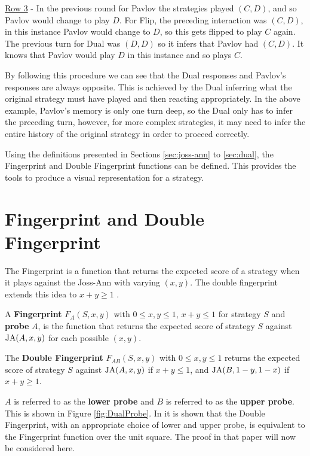 \underline{Row 3} - In the previous round for Pavlov the strategies played $(C, D)$, and so Pavlov would change to play $D$.
For Flip, the preceding interaction was $(C, D)$, in this instance Pavlov would change to $D$, so this gets flipped to play $C$ again.
The previous turn for Dual was $(D, D)$ so it infers that Pavlov had $(C, D)$.
It knows that Pavlov would play $D$ in this instance and so plays $C$.

By following this procedure we can see that the Dual responses and Pavlov's responses are always opposite.
This is achieved by the Dual inferring what the original strategy must have played and then reacting appropriately.
In the above example, Pavlov's memory is only one turn deep, so the Dual only has to infer the preceding turn, however, for more complex strategies, it may need to infer the entire history of the original strategy in order to proceed correctly.

Using the definitions presented in Sections \ref{sec:joss-ann} to \ref{sec:dual}, the Fingerprint and Double Fingerprint functions can be defined.
This provides the tools to produce a visual representation for a strategy.



\section{Fingerprint and Double Fingerprint}
The Fingerprint is a function that returns the expected score of a strategy when it plays against the Joss-Ann with varying $(x, y)$.
The double fingerprint extends this idea to $x+y \geq 1$ \cite{Ashlock2008, Ashlock2010, Ashlock2004,  Ashlock2005, Ashlock2009, Ashlock2006}.

\begin{definition}\label{def:fingerprint}
A \textbf{Fingerprint} $F_A(S, x, y)$ with $0 \leq x, y \leq 1$, $x+y \leq 1$ for strategy $S$ and \textbf{probe} $A$, is the function that returns the expected score of strategy $S$ against $\text{JA}(A, x, y)$ for each possible $(x, y)$.
\end{definition}

\begin{definition}\label{def:double-fingerprint}
The \textbf{Double Fingerprint} $F_{AB}(S, x, y)$ with $0 \leq x, y \leq 1$ returns the expected score of strategy $S$ against $\text{JA}(A, x, y)$ if $x+y \leq 1$, and $\text{JA}(B, 1-y, 1-x)$ if $x+y \geq 1$.
\end{definition}

$A$ is referred to as the \textbf{lower probe} and $B$ is referred to as the \textbf{upper probe}.
This is shown in Figure \ref{fig:DualProbe}.
In \cite{Ashlock2004} it is shown that the Double Fingerprint, with an appropriate choice of lower and upper probe, is equivalent to the Fingerprint function over the unit square.
The proof in that paper will now be considered here.

